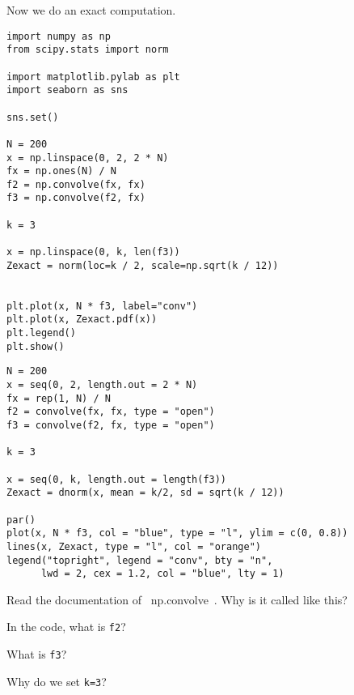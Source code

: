 \documentclass[assignments]{subfiles}
\begin{document}
Now we do an exact computation.

\begin{verbatim}
import numpy as np
from scipy.stats import norm

import matplotlib.pylab as plt
import seaborn as sns

sns.set()

N = 200
x = np.linspace(0, 2, 2 * N)
fx = np.ones(N) / N
f2 = np.convolve(fx, fx)
f3 = np.convolve(f2, fx)

k = 3

x = np.linspace(0, k, len(f3))
Zexact = norm(loc=k / 2, scale=np.sqrt(k / 12))


plt.plot(x, N * f3, label="conv")
plt.plot(x, Zexact.pdf(x))
plt.legend()
plt.show()
\end{verbatim}

\begin{verbatim}
N = 200
x = seq(0, 2, length.out = 2 * N)
fx = rep(1, N) / N
f2 = convolve(fx, fx, type = "open")
f3 = convolve(f2, fx, type = "open")

k = 3

x = seq(0, k, length.out = length(f3))
Zexact = dnorm(x, mean = k/2, sd = sqrt(k / 12))

par()
plot(x, N * f3, col = "blue", type = "l", ylim = c(0, 0.8))
lines(x, Zexact, type = "l", col = "orange")
legend("topright", legend = "conv", bty = "n",
      lwd = 2, cex = 1.2, col = "blue", lty = 1)
\end{verbatim}

\begin{exercise}
Read the documentation of ~np.convolve~. Why is it called like this?
\begin{solution}
\end{solution}
\end{exercise}

\begin{exercise}
In the code, what is \texttt{f2}?
\begin{solution}
\end{solution}
\end{exercise}

\begin{exercise}
What is \texttt{f3}?
\begin{solution}
\end{solution}
\end{exercise}

\begin{exercise}
Why do we set \texttt{k=3}?
\begin{solution}
\end{solution}
\end{exercise}
\end{document}
